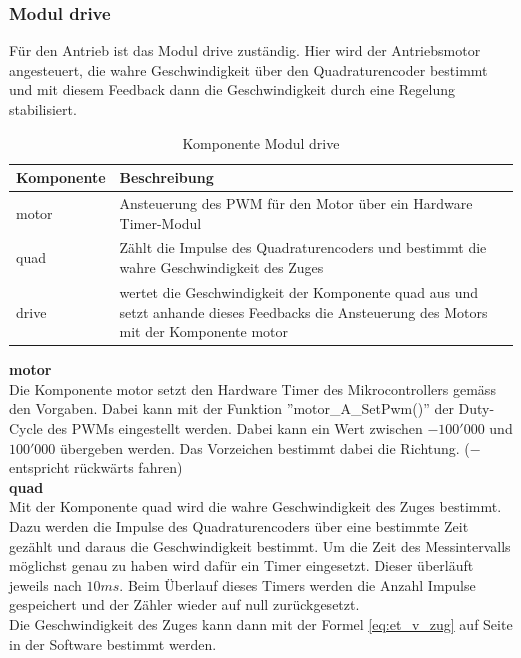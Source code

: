 \documentclass[../../main.tex]{subfiles}
\begin{document}
    \subsubsection{Modul drive} \label{et_sw_modul_drive}
    Für den Antrieb ist das Modul drive zuständig. Hier wird der Antriebsmotor angesteuert, die wahre Geschwindigkeit über den Quadraturencoder bestimmt und mit diesem Feedback dann die Geschwindigkeit durch eine Regelung stabilisiert.\\

    \begin{table}[H]
        \centering
        \begin{tabular}{|l|p{12cm}|}
        \hline
        \textbf{Komponente} & \textbf{Beschreibung}    \\ \hline
        motor  & Ansteuerung des PWM für den Motor über ein Hardware Timer-Modul \\ \hline
        quad   & Zählt die Impulse des Quadraturencoders und bestimmt die wahre Geschwindigkeit des Zuges \\ \hline
        drive  & wertet die Geschwindigkeit der Komponente quad aus und setzt anhande dieses Feedbacks die Ansteuerung des Motors mit der Komponente motor \\ \hline
        \end{tabular}
        \caption{Komponente Modul drive}
        \label{tab:et_mc_drive}
    \end{table}

    \textbf{motor}\\
    Die Komponente motor setzt den Hardware Timer des Mikrocontrollers gemäss den Vorgaben. Dabei kann mit der Funktion ''motor\_A\_SetPwm()'' der Duty-Cycle des PWMs eingestellt werden. Dabei kann ein Wert zwischen  $-100'000$ und $100'000$ übergeben werden. Das Vorzeichen bestimmt dabei die Richtung. ($-$ entspricht rückwärts fahren)\\

    \textbf{quad}\\
    Mit der Komponente quad wird die wahre Geschwindigkeit des Zuges bestimmt. Dazu werden die Impulse des Quadraturencoders über eine bestimmte Zeit gezählt und daraus die Geschwindigkeit bestimmt. Um die Zeit des Messintervalls möglichst genau zu haben wird dafür ein Timer eingesetzt. Dieser überläuft jeweils nach $10 ms$. Beim Überlauf dieses Timers werden die Anzahl Impulse gespeichert und der Zähler wieder auf null zurückgesetzt.\\
    Die Geschwindigkeit des Zuges kann dann mit der Formel \ref{eq:et_v_zug} auf Seite \pageref{eq:et_v_zug} in der Software bestimmt werden.
\end{document}

